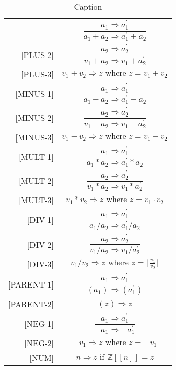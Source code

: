 \begin{table}[H]
    \centering
    \begin{longtable}[c] { r c }
        \hline
        [PLUS-1] & \( \dfrac{a_1 \Rightarrow a^{'}_{1}}{a_1 + a_2 \Rightarrow a^{'}_{1} + a_2} \) \\
        
        [PLUS-2] & \( \dfrac{a_2 \Rightarrow a^{'}_{2}}{v_1 + a_2 \Rightarrow v_1 + a^{'}_{2}} \) \\
        
        [PLUS-3] & \(v_1 + v_2 \Rightarrow z \text{ where } z = v_1 + v_2\) \\
        
        [MINUS-1] & \( \dfrac{a_1 \Rightarrow a^{'}_{1}}{a_1 - a_2 \Rightarrow a^{'}_{1} - a_2} \) \\
        
        [MINUS-2] & \( \dfrac{a_2 \Rightarrow a^{'}_{2}}{v_1 - a_2 \Rightarrow v_1 - a^{'}_{2}} \) \\
        
        [MINUS-3] & \(v_1 - v_2 \Rightarrow z \text{ where } z = v_1 - v_2\) \\
        
        [MULT-1] & \( \dfrac{a_1 \Rightarrow a^{'}_{1}}{a_1 * a_2 \Rightarrow a^{'}_{1} * a_2} \) \\
        
        [MULT-2] & \( \dfrac{a_2 \Rightarrow a^{'}_{2}}{v_1 * a_2 \Rightarrow v_1 * a^{'}_{2}} \) \\
        
        [MULT-3] & \(v_1 * v_2 \Rightarrow z \text{ where } z = v_1 \cdot v_2\) \\
        
        [DIV-1] & \( \dfrac{a_1 \Rightarrow a^{'}_{1}}{a_1 / a_2 \Rightarrow a^{'}_{1} / a_2} \) \\
        
        [DIV-2] & \( \dfrac{a_2 \Rightarrow a^{'}_{2}}{v_1 / a_2 \Rightarrow v_1 / a^{'}_{2}} \) \\
        
        [DIV-3] & \(v_1 / v_2 \Rightarrow z \text{ where } z = \lfloor\frac{v_1} {v_2}\rfloor\) \\
        
        [PARENT-1] & \( \dfrac{a_1 \Rightarrow a^{'}_{1}}{(a_1) \Rightarrow (a^{'}_{1})} \) \\
        
        [PARENT-2] & \( (z) \Rightarrow z \) \\
        
        [NEG-1] & \( \dfrac{a_1 \Rightarrow a^{'}_{1}}{-a_1 \Rightarrow -a^{'}_{1}} \) \\
        
        [NEG-2] & \( -v_1 \Rightarrow z \text{ where } z = -v_1 \)\\
        
        [NUM] & \( n \Rightarrow z \text{ if } \mathbb{Z}[[n]] = z \) \\
        
        \hline
    \end{longtable}
    \caption{Caption}\label{tab:my_label}
\end{table}